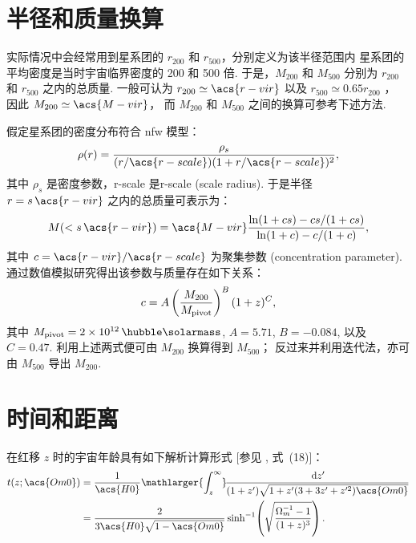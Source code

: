 \section{半径和质量换算}

实际情况中会经常用到星系团的 $r_{200}$ 和 $r_{500}$，分别定义为该半径范围内
星系团的平均密度是当时宇宙临界密度的 200 和 500 倍.
于是，$M_{200}$ 和 $M_{500}$ 分别为 $r_{200}$ 和 $r_{500}$ 之内的总质量.
一般可认为 $r_{200} \simeq \acs{r-vir}$
以及 $r_{500} \simeq 0.65 r_{200}$ \cite{ettori2009}，
因此 $M_{200} \simeq \acs{M-vir}$，
而 $M_{200}$ 和 $M_{500}$ 之间的换算可参考下述方法.

假定星系团的密度分布符合 \ac{nfw} 模型\cite{navarro1997}：
\begin{equation}
  \label{eq:nfw}
  \rho(r) = \frac{\rho_s}{
    (r / \acs{r-scale}) (1 + r / \acs{r-scale})^2} ,
\end{equation}
其中 $\rho_s$ 是密度参数，\acs{r-scale} 是\acl{r-scale} (scale radius).
于是半径 $r = s \,\acs{r-vir}$ 之内的总质量可表示为\cite{lokas2001}：
\begin{equation}
  \label{eq:mass-r}
  M(< s \,\acs{r-vir}) = \acs{M-vir}
    \frac{\ln(1 + c s) - c s / (1 + c s)}{\ln(1 + c) - c / (1 + c)} ,
\end{equation}
其中 $c = \acs{r-vir} / \acs{r-scale}$ 为聚集参数 (concentration parameter).
 通过数值模拟研究得出该参数与质量存在如下关系：
\begin{equation}
  \label{eq:mass-c}
  c = A \left( \frac{M_{200}}{M_{\mathrm{pivot}}} \right)^B (1+z)^C ,
\end{equation}
其中 $M_{\R{pivot}} = \SI{2e12}{\per\hubble\solarmass}$,
$A = 5.71$, $B = -0.084$, 以及 $C = 0.47$.
利用上述两式便可由 $M_{200}$ 换算得到 $M_{500}$；
反过来并利用迭代法，亦可由 $M_{500}$ 导出 $M_{200}$.


\section{时间和距离}

在红移 $z$ 时的宇宙年龄具有如下解析计算形式
[参见 , 式~(18)]：
\begin{align}
  \label{eq:universe-age}
  t(z; \acs{Om0})
    & = \frac{1}{\acs{H0}} \mathlarger{\int_z^{\infty}}
      \!\frac{\D{z'}}{(1+z')\sqrt{1 + z' (3+3z'+z'^2) \acs{Om0}}}
      \nonumber \\
    & = \frac{2}{3 \acs{H0} \sqrt{1-\acs{Om0}}} \sinh^{-1}
      \!\left( \sqrt{\frac{\Omega_m^{-1} - 1}{(1+z)^3}} \right).
\end{align}

